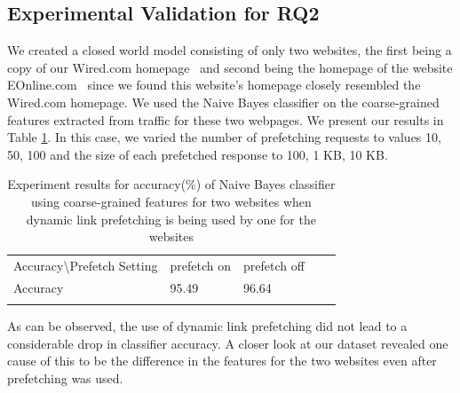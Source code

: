 \subsection{Experimental Validation for RQ2}
We created a closed world model consisting of only two websites, the first being a copy of our Wired.com homepage~\cite{tj-wired} and second being the homepage of the website EOnline.com~\cite{eonline} since we found this website's homepage closely resembled the Wired.com homepage. 
We used the Naive Bayes classifier on the coarse-grained features extracted from traffic for these two webpages. 
We present our results in Table \ref{table:rq2-nb}. 
In this case, we varied the number of prefetching requests to values 10, 50, 100 and the size of each prefetched response to 100, 1 KB, 10 KB. 

\begin{table}[]
\centering
\caption{Experiment results for accuracy(\%) of Naive Bayes classifier using coarse-grained features for two websites when dynamic link prefetching is being used by one for the websites}
\label{table:rq2-nb}
\begin{tabular}{lllll}
\cline{1-3}
\multicolumn{1}{|l|}{Accuracy\textbackslash Prefetch Setting} & \multicolumn{1}{l|}{prefetch on} & \multicolumn{1}{l|}{prefetch off} &  &  \\ \cline{1-3}
\multicolumn{1}{|l|}{Accuracy}                    & \multicolumn{1}{l|}{95.49}         & \multicolumn{1}{l|}{96.64}          &  &  \\ \cline{1-3}
                                                     &                                  &                                   &  & 
\end{tabular}                  
\end{table}

As can be observed, the use of dynamic link prefetching did not lead to a considerable drop in classifier accuracy. 
A closer look at our dataset revealed one cause of this to be the difference in the features for the two websites even after prefetching was used. 

